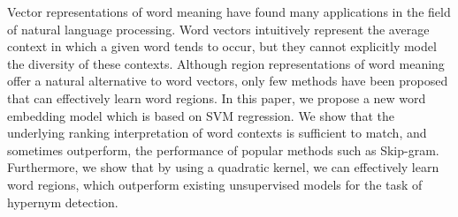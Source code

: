 Vector representations of word meaning have found many applications in the field of natural language processing. Word vectors intuitively represent the average context in which a given word tends to occur, but they cannot explicitly model the diversity of these contexts. Although region representations of word meaning offer a natural alternative to word vectors, only few methods have been proposed that can effectively learn word regions. In this paper, we propose a new word embedding model which is based on SVM regression. We show that the underlying ranking interpretation of word contexts is sufficient to match, and sometimes outperform, the performance of popular methods such as Skip-gram. Furthermore, we show that by using a quadratic kernel, we can effectively learn word regions, which outperform existing unsupervised models for the task of hypernym detection.
